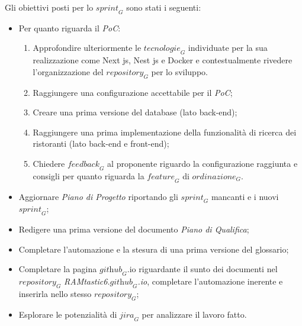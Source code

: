 Gli obiettivi posti per lo $\textit{sprint}_G$ sono stati i seguenti:
\begin{itemize}
    \item Per quanto riguarda il \emph{PoC}:
    \begin{enumerate}
        \item Approfondire ulteriormente le $\textit{tecnologie}_G$ individuate per la sua realizzazione come Next js, Nest js e Docker e contestualmente rivedere l'organizzazione del $\textit{repository}_G$ per lo sviluppo.
        \item Raggiungere una configurazione accettabile per il \emph{PoC};
        \item Creare una prima versione del database (lato back-end);
        \item Raggiungere una prima implementazione della funzionalità di ricerca dei ristoranti (lato back-end e front-end);
        \item Chiedere $\textit{feedback}_G$ al proponente riguardo la configurazione raggiunta e consigli per quanto riguarda la $\textit{feature}_G$ di $\textit{ordinazione}_G$.
    \end{enumerate}
    \item Aggiornare \emph{Piano di Progetto} riportando gli $\textit{sprint}_G$ mancanti e i nuovi $\textit{sprint}_G$;
    \item Redigere una prima versione del documento \emph{Piano di Qualifica};
    \item Completare l'automazione e la stesura di una prima versione del glossario;
    \item Completare la pagina $\textit{github}_G$.io riguardante il sunto dei documenti nel $\textit{repository}_G$ \emph{RAMtastic6.$\textit{github}_G$.io}, completare l'automazione inerente e inserirla nello stesso $\textit{repository}_G$;
    \item Esplorare le potenzialità di $\textit{jira}_G$ per analizzare il lavoro fatto.
\end{itemize}


